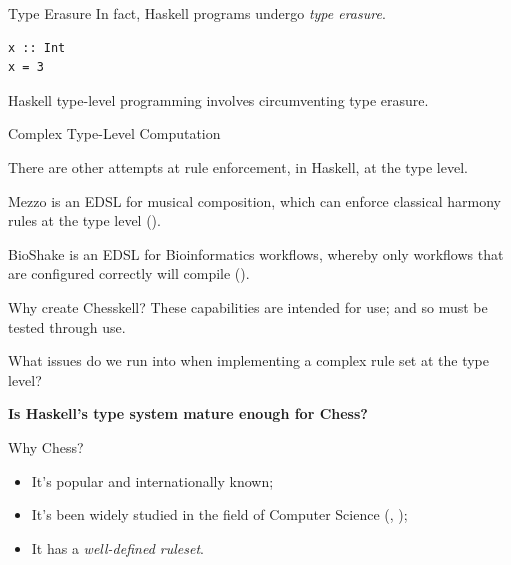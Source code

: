 \documentclass{beamer}
\begin{document}
\begin{frame}[fragile]{Type Erasure}
In fact, Haskell programs undergo \emph{type erasure}.

\pause

\begin{lstlisting}
x :: Int
x = 3
\end{lstlisting}

Haskell type-level programming involves circumventing type erasure.

\end{frame}

\begin{frame}{Complex Type-Level Computation}

There are other attempts at rule enforcement, in Haskell, at the type level.

\pause

Mezzo is an EDSL for musical composition, which can enforce classical harmony rules at the type level (\cite{mezzohaskellsymposium}).

\pause

BioShake is an EDSL for Bioinformatics workflows, whereby only workflows that are configured correctly will compile (\cite{bioshake}).
    
\end{frame}

\begin{frame}[fragile]{Why create Chesskell?}
These capabilities are intended for use; and so must be tested through use.

What issues do we run into when implementing a complex rule set at the type level?

\pause

\textbf{Is Haskell's type system mature enough for Chess?}

\end{frame}

\begin{frame}{Why Chess?}

\begin{itemize}
    \item<1-3> It's popular and internationally known;
    \item<2-3> It's been widely studied in the field of Computer Science (\cite{chesseducation}, \cite{chessml});
    \item<3-4> It has a \emph{well-defined ruleset}.
\end{itemize}
    
\end{frame}
\end{document}
